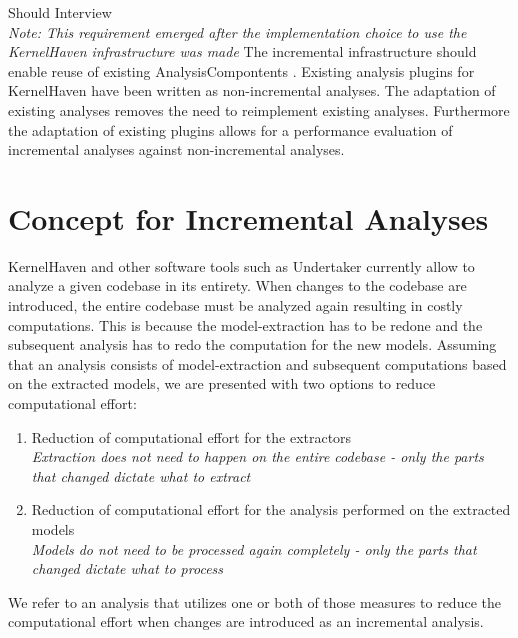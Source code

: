 \documentclass[a4paper]{article}
\begin{document}
\vspace{1em}

\begin{req} \label{req:existing-analyses}
\reqtable
    {Should}  {Interview \\ \emph{Note: This requirement emerged after the implementation choice to use the KernelHaven infrastructure was made}}
	{The incremental infrastructure should enable reuse of existing AnalysisCompontents .}
	{Existing analysis plugins for KernelHaven have been written as non-incremental analyses. The adaptation of existing analyses removes the need to reimplement existing analyses. Furthermore the adaptation of existing plugins allows for a performance evaluation of incremental analyses against non-incremental analyses.}
\end{req}

\newpage

\section{Concept for Incremental Analyses}\label{concept}

KernelHaven and other software tools such as Undertaker\cite{Tartler:2011:FCC:1966445.1966451} currently allow to analyze a given codebase in its entirety. When changes to the codebase are introduced, the entire codebase must be analyzed again resulting in costly computations. This is because the model-extraction has to be redone and the subsequent analysis has to redo the computation for the new models. Assuming that an analysis consists of model-extraction and subsequent computations based on the extracted models, we are presented with two options to reduce computational effort:

\begin{enumerate}
	\item Reduction of computational effort for the extractors \\
	\emph{Extraction does not need to happen on the entire codebase - only the parts that changed dictate what to extract}
	\item Reduction of computational effort for the analysis performed on the extracted models \\
	\emph{Models do not need to be processed again completely - only the parts that changed dictate what to process}
\end{enumerate}

We refer to an analysis that utilizes one or both of those measures to reduce the computational effort when changes are introduced as an incremental analysis.
\end{document}
